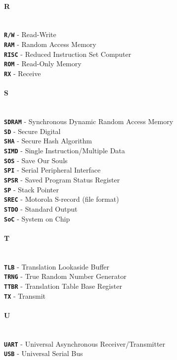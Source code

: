 \documentclass[english, ing, kiv, he, iso690numb, pdf]{fasthesis}
\begin{document}
	\paragraph{R}
	\\
	\noindent
	\textbf{\texttt{R/W}} - Read-Write \\
	\textbf{\texttt{RAM}} - Random Access Memory \\
	\textbf{\texttt{RISC}} - Reduced Instruction Set Computer \\
	\textbf{\texttt{ROM}} - Read-Only Memory \\
	\textbf{\texttt{RX}} - Receive \\
	\paragraph{S}
	\\
	\noindent
	\textbf{\texttt{SDRAM}} - Synchronous Dynamic Random Access Memory \\
	\textbf{\texttt{SD}} - Secure Digital \\
	\textbf{\texttt{SHA}} - Secure Hash Algorithm \\
	\textbf{\texttt{SIMD}} - Single Instruction/Multiple Data \\
	\textbf{\texttt{SOS}} - Save Our Souls \\
	\textbf{\texttt{SPI}} - Serial Peripheral Interface \\
	\textbf{\texttt{SPSR}} - Saved Program Status Register \\
	\textbf{\texttt{SP}} - Stack Pointer \\
	\textbf{\texttt{SREC}} - Motorola S-record (file format) \\
	\textbf{\texttt{STDO}} - Standard Output \\
	\textbf{\texttt{SoC}} - System on Chip \\
	\paragraph{T}
	\\
	\noindent
	\textbf{\texttt{TLB}} - Translation Lookaside Buffer \\
	\textbf{\texttt{TRNG}} - True Random Number Generator \\
	\textbf{\texttt{TTBR}} - Translation Table Base Register \\
	\textbf{\texttt{TX}} - Transmit \\
	\paragraph{U}
	\\
	\noindent
	\textbf{\texttt{UART}} - Universal Asynchronous Receiver/Transmitter \\
	\textbf{\texttt{USB}} - Universal Serial Bus \\
	\\
	\\
\end{document}
